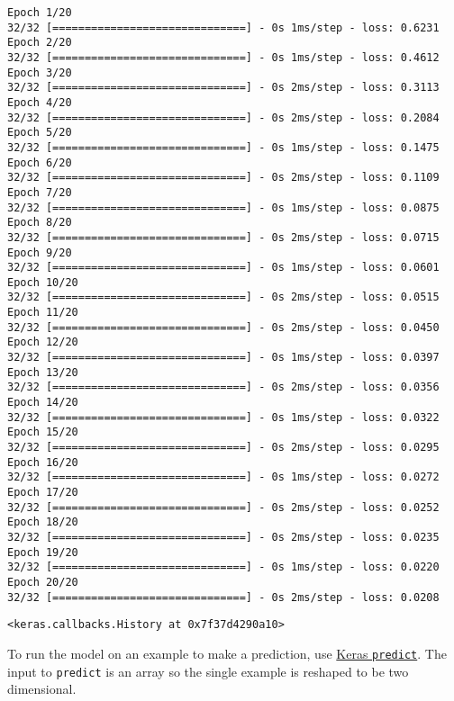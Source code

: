 \documentclass[11pt]{article}
\makeatletter
\newcommand{\boxspacing}{\kern\kvtcb@left@rule\kern\kvtcb@boxsep}
\newcommand{\prompt}[4]{
        \ttfamily\llap{{\color{#2}[#3]:\hspace{3pt}#4}}\vspace{-\baselineskip}
    }
\makeatother
\begin{document}
    \begin{Verbatim}[commandchars=\\\{\}]
Epoch 1/20
32/32 [==============================] - 0s 1ms/step - loss: 0.6231
Epoch 2/20
32/32 [==============================] - 0s 1ms/step - loss: 0.4612
Epoch 3/20
32/32 [==============================] - 0s 2ms/step - loss: 0.3113
Epoch 4/20
32/32 [==============================] - 0s 2ms/step - loss: 0.2084
Epoch 5/20
32/32 [==============================] - 0s 1ms/step - loss: 0.1475
Epoch 6/20
32/32 [==============================] - 0s 2ms/step - loss: 0.1109
Epoch 7/20
32/32 [==============================] - 0s 1ms/step - loss: 0.0875
Epoch 8/20
32/32 [==============================] - 0s 2ms/step - loss: 0.0715
Epoch 9/20
32/32 [==============================] - 0s 1ms/step - loss: 0.0601
Epoch 10/20
32/32 [==============================] - 0s 2ms/step - loss: 0.0515
Epoch 11/20
32/32 [==============================] - 0s 2ms/step - loss: 0.0450
Epoch 12/20
32/32 [==============================] - 0s 1ms/step - loss: 0.0397
Epoch 13/20
32/32 [==============================] - 0s 2ms/step - loss: 0.0356
Epoch 14/20
32/32 [==============================] - 0s 1ms/step - loss: 0.0322
Epoch 15/20
32/32 [==============================] - 0s 2ms/step - loss: 0.0295
Epoch 16/20
32/32 [==============================] - 0s 1ms/step - loss: 0.0272
Epoch 17/20
32/32 [==============================] - 0s 2ms/step - loss: 0.0252
Epoch 18/20
32/32 [==============================] - 0s 2ms/step - loss: 0.0235
Epoch 19/20
32/32 [==============================] - 0s 1ms/step - loss: 0.0220
Epoch 20/20
32/32 [==============================] - 0s 2ms/step - loss: 0.0208
    \end{Verbatim}

            \begin{tcolorbox}[breakable, size=fbox, boxrule=.5pt, pad at break*=1mm, opacityfill=0]
\prompt{Out}{outcolor}{14}{\boxspacing}
\begin{Verbatim}[commandchars=\\\{\}]
<keras.callbacks.History at 0x7f37d4290a10>
\end{Verbatim}
\end{tcolorbox}
        
    To run the model on an example to make a prediction, use
\href{https://www.tensorflow.org/api_docs/python/tf/keras/Model}{Keras
\texttt{predict}}. The input to \texttt{predict} is an array so the
single example is reshaped to be two dimensional.
\end{document}
